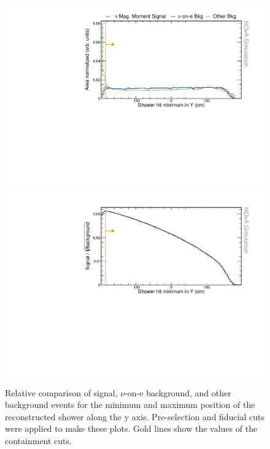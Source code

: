 \begin{figure}[hbtp]
\centering
\includegraphics[width=.9\textwidth]{Plots/NuMMEventSelection/N1Cut_minY.pdf}
\includegraphics[width=.9\textwidth]{Plots/NuMMEventSelection/NuMM_N1Cut_minYright_FOMStats.pdf}
\caption{Relative comparison of signal, $\nu$-on-e background, and other background events for the minimum and maximum position of the reconstructed shower along the y axis. Pre-selection and fiducial cuts were applied to make these plots. Gold lines show the values of the containment cuts.}
\label{fig:NuMMContainmentCutMinY}
\end{figure}

